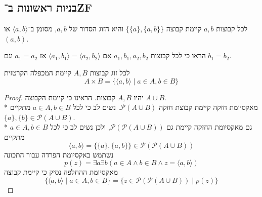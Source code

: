 \subsection{בניות ראשונות ב־ZF}
\begin{proposition}
	לכל קבוצות $a, b$ קיימת קבוצה $\{ \{a\}, \{a, b\}\}$ והיא הזוג הסדור של $a, b$, מסומן ב־$\langle a, b \rangle$ או $(a, b)$.
\end{proposition}
\begin{exercise}
	הראו כי לכל קבוצות $a_1, b_1, a_2, b_2$ אם $\langle a_1, b_1 \rangle = \langle a_2, b_2 \rangle$ אז $a_1 = a_2$ וגם $b_1 = b_2$.
\end{exercise}
\begin{proposition}
	לכל זוג קבוצות $A, B$ קיימת המכפלה הקרטזית
	\[
		A \times B = \{ \langle a, b \rangle \mid a \in A, b \in B \}
	\]
\end{proposition}
\begin{proof}
	יהיו $A, B$ קבוצות. הראינו כי קיימת הקבוצה $A \cup B$. \\*
	מאקסיומת חזקה קיימת קבוצת חזקה $\mathcal{P}(A \cup B)$. 
	נשים לב כי לכל $a \in A, b \in B$ מתקיים $\{a\}, \{b\} \in \mathcal{P}(A \cup B)$. \\*
	גם מאקסיומת החזקה קיימת גם $\mathcal{P}(\mathcal{P}(A \cup B))$, ולכן נשים לב כי לכל $a \in A, b \in B$ מתקיים
	\[
		\langle a, b \rangle = \{\{a\}, \{a, b\}\} \in \mathcal{P}(\mathcal{P}(A \cup B))
	\]
	נשתמש באקסיומת הפרדה עבור התכונה
	\[
		p(z) = \exists a \exists b (a \in A \land b \in B \land z = \langle a, b \rangle)
	\]
	מאקסיומת ההחלפה נסיק כי קיימת קבוצה
	\[
		\{ \langle a, b \rangle \mid a \in A, b \in B \} = \{ z \in \mathcal{P}(\mathcal{P}(A \cup B)) \mid p(z) \}
	\]
\end{proof}


